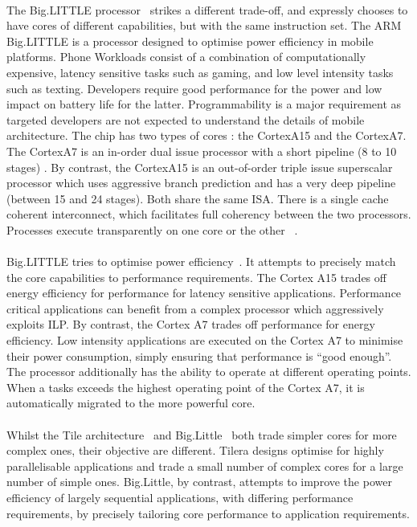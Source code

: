 \paragraph{} The Big.LITTLE processor~\cite{greenhalgh2011biglittle} strikes 
a different trade-off, and expressly chooses to have cores of different capabilities, but with the same instruction set. The ARM Big.LITTLE is a processor
designed to optimise power efficiency in mobile platforms. 
Phone Workloads consist of a combination of computationally expensive, latency sensitive tasks such as gaming, and low level intensity tasks such as texting. 
Developers require good performance for the power and low impact on battery life for the latter. Programmability is a major requirement as targeted developers
are not expected to understand the details of mobile architecture. 
 The chip has two types of cores
: the CortexA15 and the CortexA7. The CortexA7 is an in-order dual issue
processor with a short pipeline (8 to 10 stages) . By contrast,  the CortexA15
 is an out-of-order triple issue superscalar processor
which uses aggressive branch prediction and has a very deep pipeline
(between 15 and 24 stages). Both share the same ISA. There is a single cache
coherent interconnect, which facilitates full coherency between the 
two processors. Processes execute transparently on one core or the other~\cite{greenhalgh2011biglittle} .

\paragraph{} Big.LITTLE tries to optimise power efficiency~\cite{greenhalgh2011biglittle}. It attempts to 
precisely match the core capabilities to performance requirements. The Cortex A15 trades off energy efficiency for performance for latency sensitive applications. Performance critical applications
can benefit from a complex processor which aggressively exploits ILP. 
By contrast, the Cortex A7 trades off performance for energy efficiency. Low 
intensity applications are executed on the Cortex A7 to minimise their power 
consumption, simply ensuring that performance is ``good enough''.  The processor additionally has the ability to operate at different operating points. When a tasks exceeds the highest operating point of the Cortex A7, it is automatically migrated to the more powerful core. 

\paragraph{} Whilst the Tile architecture~\cite{wentzlaff2007tile} and Big.Little~\cite{greenhalgh2011biglittle} both trade simpler cores for 
more complex ones, their objective are different. Tilera designs optimise
for highly parallelisable applications and trade a small number of 
complex cores for a large number of simple ones. Big.Little, by contrast, attempts to improve the power efficiency of largely sequential applications, with differing performance requirements, by precisely tailoring core performance to application requirements. 

